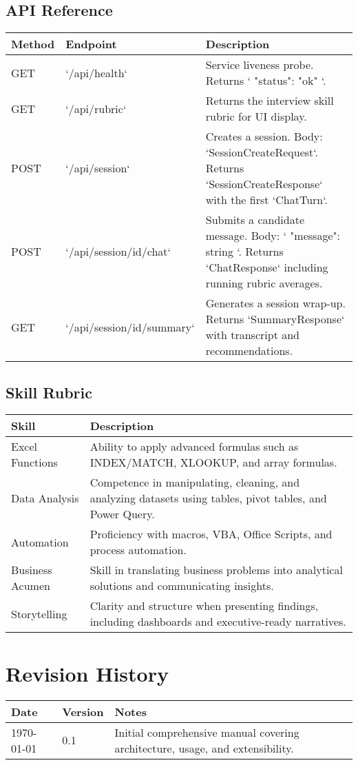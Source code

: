 \documentclass[11pt]{article}
\begin{document}
\subsection{API Reference}
\begin{longtable}{>{\raggedright\arraybackslash}p{3cm} >{\raggedright\arraybackslash}p{3.5cm} >{\raggedright\arraybackslash}p{7cm}}
\toprule
\textbf{Method} & \textbf{Endpoint} & \textbf{Description} \\ \midrule
GET & `/api/health` & Service liveness probe. Returns `{ "status": "ok" }`. \\
GET & `/api/rubric` & Returns the interview skill rubric for UI display. \\
POST & `/api/session` & Creates a session. Body: `SessionCreateRequest`. Returns `SessionCreateResponse` with the first `ChatTurn`. \\
POST & `/api/session/{id}/chat` & Submits a candidate message. Body: `{ "message": string }`. Returns `ChatResponse` including running rubric averages. \\
GET & `/api/session/{id}/summary` & Generates a session wrap-up. Returns `SummaryResponse` with transcript and recommendations. \\
\bottomrule
\end{longtable}

\subsection{Skill Rubric}
\begin{longtable}{>{\raggedright\arraybackslash}p{4cm} >{\raggedright\arraybackslash}p{9cm}}
\toprule
\textbf{Skill} & \textbf{Description} \\ \midrule
Excel Functions & Ability to apply advanced formulas such as INDEX/MATCH, XLOOKUP, and array formulas. \\
Data Analysis & Competence in manipulating, cleaning, and analyzing datasets using tables, pivot tables, and Power Query. \\
Automation & Proficiency with macros, VBA, Office Scripts, and process automation. \\
Business Acumen & Skill in translating business problems into analytical solutions and communicating insights. \\
Storytelling & Clarity and structure when presenting findings, including dashboards and executive-ready narratives. \\
\bottomrule
\end{longtable}

\section*{Revision History}
\begin{tabular}{@{}p{3cm}p{3cm}p{7cm}@{}}
\toprule
\textbf{Date} & \textbf{Version} & \textbf{Notes} \\ \midrule
\today & 0.1 & Initial comprehensive manual covering architecture, usage, and extensibility. \\
\bottomrule
\end{tabular}
\end{document}
